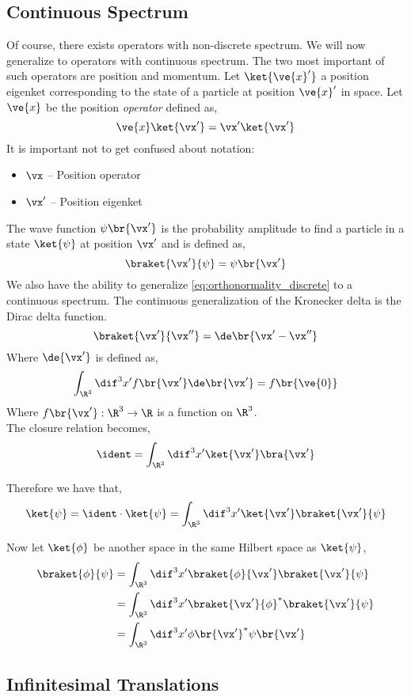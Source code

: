 \documentclass{article}
\begin{document}
\subsection{Continuous Spectrum}
Of course, there exists operators with non-discrete spectrum. We will now generalize to operators with continuous spectrum. The two most important of such operators are position and momentum. Let $\ket{\ve{x}'}$ a position eigenket corresponding to the state of a particle at position $\ve{x}'$ in space. Let $\ve{x}$ be the position \textit{operator} defined as,
\[ \ve{x} \ket{\vx'} = \vx' \ket{\vx'} \]
It is important not to get confused about notation:
\begin{itemize}
    \item $\vx$ -- Position operator
    \item $\vx'$ -- Position eigenket
\end{itemize}
The wave function $\psi\br{\vx'}$ is the probability amplitude to find a particle in a state $\ket{\psi}$ at position $\vx'$ and is defined as,
\[ \braket{\vx'}{\psi} = \psi\br{\vx'} \]
We also have the ability to generalize \cref{eq:orthonormality_discrete} to a continuous spectrum. The continuous generalization of the Kronecker delta is the Dirac delta function.
\[ \braket{\vx'}{\vx''} = \de\br{\vx' - \vx''} \]
Where $\de{\vx'}$ is defined as,
\[ \int_{\R^3} \dif^3 x' f\br{\vx'} \de\br{\vx'} = f\br{\ve{0}} \]
Where $f\br{\vx'} : \R^3 \to \R$ is a function on $\R^3$. \\

The closure relation becomes,
\[ \ident = \int_{\R^3} \dif^3 x' \ket{\vx'} \bra{\vx'} \]

Therefore we have that,
\[ \ket{\psi} = \ident \cdot \ket{\psi} = \int_{\R^3} \dif^3 x' \ket{\vx'} \braket{\vx'}{\psi} \]

Now let $\ket{\phi}$ be another space in the same Hilbert space as $\ket{\psi}$,
\begin{align*}
\braket{\phi}{\psi} &= \int_{\R^3} \dif^3 x' \braket{\phi}{\vx'} \braket{\vx'}{\psi} \\
&= \int_{\R^3} \dif^3 x' \braket{\vx'}{\phi}^{*} \braket{\vx'}{\psi} \\
&= \int_{\R^3} \dif^3 x' \phi\br{\vx'}^{*} \psi\br{\vx'}
\end{align*}

\subsection{Infinitesimal Translations}
\end{document}
